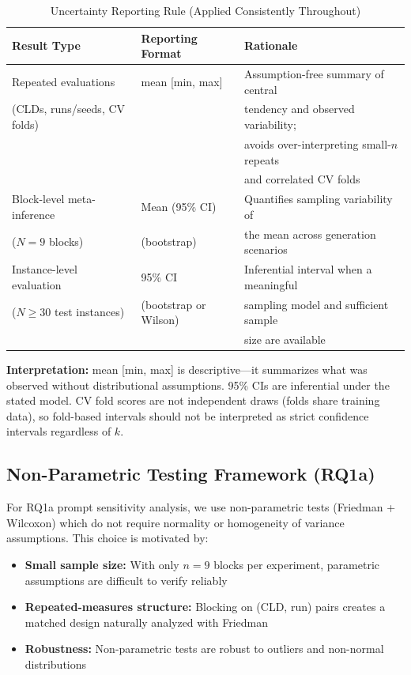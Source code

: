 \begin{table}[H]
\centering
\caption{Uncertainty Reporting Rule (Applied Consistently Throughout)}
\label{tab:uncertainty_rule}
\footnotesize
\begin{tabular}{@{}l l l@{}}
\toprule
\textbf{Result Type} & \textbf{Reporting Format} & \textbf{Rationale} \\
\midrule
Repeated evaluations & mean [min, max] & Assumption-free summary of central \\
(CLDs, runs/seeds, CV folds) & & tendency and observed variability; \\
 & & avoids over-interpreting small-$n$ repeats \\
 & & and correlated CV folds \\
\midrule
Block-level meta-inference & Mean (95\% CI) & Quantifies sampling variability of \\
($N=9$ blocks) & (bootstrap) & the mean across generation scenarios \\
\midrule
Instance-level evaluation & 95\% CI & Inferential interval when a meaningful \\
($N \geq 30$ test instances) & (bootstrap or Wilson) & sampling model and sufficient sample \\
 & & size are available \\
\bottomrule
\end{tabular}
\end{table}

\textbf{Interpretation:} mean [min, max] is descriptive---it summarizes what was observed without distributional assumptions. 95\% CIs are inferential under the stated model. CV fold scores are not independent draws (folds share training data), so fold-based intervals should not be interpreted as strict confidence intervals regardless of $k$.

\subsection{Non-Parametric Testing Framework (RQ1a)}

For RQ1a prompt sensitivity analysis, we use non-parametric tests (Friedman + Wilcoxon) which do not require normality or homogeneity of variance assumptions. This choice is motivated by:
\begin{itemize}[noitemsep]
    \item \textbf{Small sample size:} With only $n=9$ blocks per experiment, parametric assumptions are difficult to verify reliably
    \item \textbf{Repeated-measures structure:} Blocking on (CLD, run) pairs creates a matched design naturally analyzed with Friedman
    \item \textbf{Robustness:} Non-parametric tests are robust to outliers and non-normal distributions
\end{itemize}

